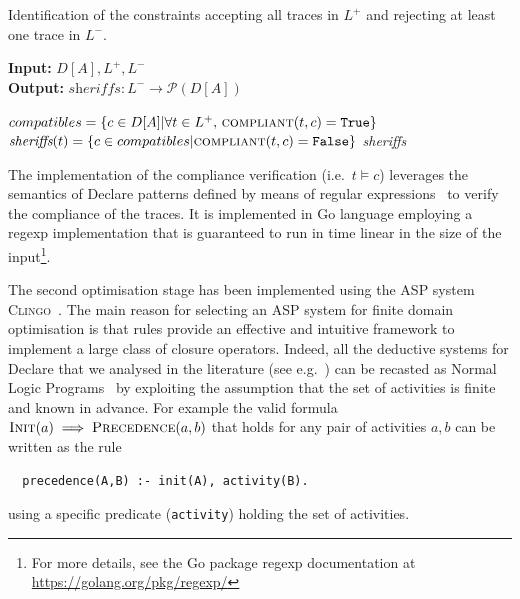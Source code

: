 \documentclass[a4wide,11pt]{article}
\theoremstyle{definition}
\theoremstyle{plain}
\newcommand{\sheriff}{sheriffs}
\begin{document}
\makeatletter
\algrenewcommand\ALG@beginalgorithmic{\footnotesize}
\makeatother

\begin{algorithm}
    \caption{Identification of the constraints accepting all traces in $L^+$ and rejecting at least one trace in $L^-$.}
    \label{algcand}
    \textbf{Input:}  $D[A], L^+, L^-$\\
    \textbf{Output:} $\textit{\sheriff} : L^- \rightarrow \mathcal{P}({D[A]})$
    	\begin{algorithmic}[1] 
   \Procedure{\sheriff Generation}{$D[A],\, L^+,\, L^-$} 
   	\State ${compatibles}= \{c \in D[A]| \forall t \in L^+,\, \Call{compliant}{t,c} = \texttt{True}\}$ 
	\label{algcand:candidates}
		\State $\textit{\sheriff}(t) = \{c \in {compatibles} | \Call{compliant}{t,c} = \texttt{False}\}$\label{algcand:choices}
	\EndFor
	\State \Return \textit{\sheriff}
    \EndProcedure
    \end{algorithmic}
\end{algorithm}

\makeatletter
\algrenewcommand\ALG@beginalgorithmic{\normalsize}
\makeatother

The implementation of the compliance verification  (i.e.\ $t\models c$) leverages the semantics of Declare patterns defined by means of regular expressions \cite{2017-DiCiccio}%
~to verify the compliance of the traces. It is implemented in Go language employing a regexp implementation that is guaranteed to run in time linear in the size of the input\footnote{For more details, see the Go package regexp documentation at \url{https://golang.org/pkg/regexp/}}.
\lstset{language=Prolog}

The second optimisation stage has been implemented using the \ac{ASP} system \textsc{Clingo}~\cite{DBLP:journals/corr/GebserKKS14}. The main reason for selecting an \ac{ASP} system for finite domain optimisation is that rules provide an effective and intuitive framework to implement a large class of closure operators. Indeed, all the deductive systems for Declare that we analysed in the literature (see e.g.~\cite{2016-Bernardi,2017-DiCiccio}) can be recasted as Normal Logic Programs~\cite{2008-Lifschitz} by exploiting the assumption that the set of activities is finite and known in advance.
%
For example the valid formula $\textsc{Init}(a)\implies\textsc{Precedence}(a,b)$ that holds for any pair of activities $a, b$ can be written as the rule
\begin{lstlisting}
  precedence(A,B) :- init(A), activity(B).
\end{lstlisting}
using a specific predicate (\lstinline{activity}) holding the set of activities.
\end{document}
